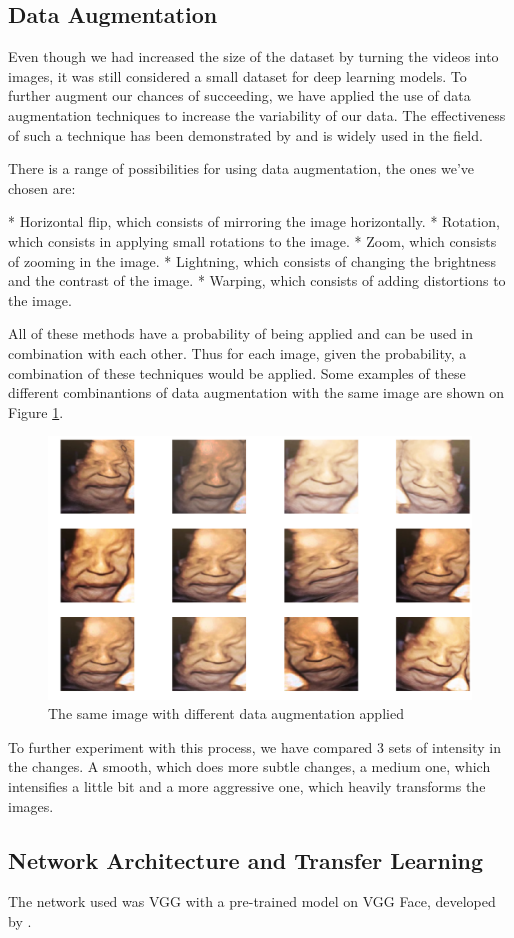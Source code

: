 \subsection{Data Augmentation}

Even though we had increased the size of the dataset by turning the videos into images, it was still considered a small dataset for deep learning models. To further augment our chances of succeeding, we have applied the use of data augmentation techniques to increase the variability of our data. The effectiveness of such a technique has been demonstrated by \cite{abs-1712-04621} and is widely used in the field.

There is a range of possibilities for using data augmentation, the ones we've chosen are:

* Horizontal flip, which consists of mirroring the image horizontally. 
* Rotation, which consists in applying small rotations to the image.
* Zoom, which consists of zooming in the image.
* Lightning, which consists of changing the brightness and the contrast of the image.
* Warping, which consists of adding distortions to the image. 

All of these methods have a probability of being applied and can be used in combination with each other. Thus for each image, given the probability, a combination of these techniques would be applied. Some examples of these different combinantions of data augmentation with the same image are shown on Figure \ref{fig:data_augmentation}.

\begin{figure}[h!tp]
    \centering
    \includegraphics[width=.9\textwidth]{imgs/chap3_data_augmentation.png}
    \caption{The same image with different data augmentation applied}
    \label{fig:data_augmentation}
\end{figure}

To further experiment with this process, we have compared 3 sets of intensity in the changes. A smooth, which does more subtle changes, a medium one, which intensifies a little bit and a more aggressive one, which heavily transforms the images.  
\subsection{Network Architecture and Transfer Learning}

The network used was VGG with a pre-trained model on VGG Face, developed by \cite{ParkhiVZ15}.



